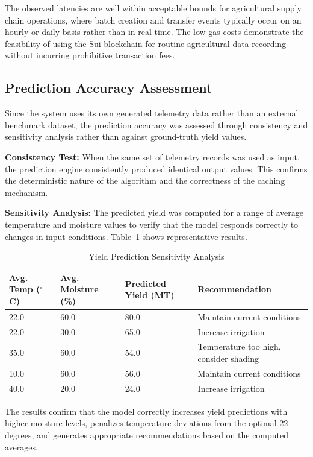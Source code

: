 The observed latencies are well within acceptable bounds for agricultural supply chain operations, where batch creation and transfer events typically occur on an hourly or daily basis rather than in real-time. The low gas costs demonstrate the feasibility of using the Sui blockchain for routine agricultural data recording without incurring prohibitive transaction fees.

\subsection{Prediction Accuracy Assessment}

Since the system uses its own generated telemetry data rather than an external benchmark dataset, the prediction accuracy was assessed through consistency and sensitivity analysis rather than against ground-truth yield values.

\textbf{Consistency Test:} When the same set of telemetry records was used as input, the prediction engine consistently produced identical output values. This confirms the deterministic nature of the algorithm and the correctness of the caching mechanism.

\textbf{Sensitivity Analysis:} The predicted yield was computed for a range of average temperature and moisture values to verify that the model responds correctly to changes in input conditions. Table~\ref{tab:sensitivity} shows representative results.

\begin{table}[H]
\centering
\caption{Yield Prediction Sensitivity Analysis}
\label{tab:sensitivity}
\begin{tabularx}{\textwidth}{|l|l|l|X|}
\hline
\textbf{Avg. Temp ($^\circ$C)} & \textbf{Avg. Moisture (\%)} & \textbf{Predicted Yield (MT)} & \textbf{Recommendation} \\
\hline
22.0 & 60.0 & 80.0 & Maintain current conditions \\
\hline
22.0 & 30.0 & 65.0 & Increase irrigation \\
\hline
35.0 & 60.0 & 54.0 & Temperature too high, consider shading \\
\hline
10.0 & 60.0 & 56.0 & Maintain current conditions \\
\hline
40.0 & 20.0 & 24.0 & Increase irrigation \\
\hline
\end{tabularx}
\end{table}

The results confirm that the model correctly increases yield predictions with higher moisture levels, penalizes temperature deviations from the optimal 22 degrees, and generates appropriate recommendations based on the computed averages.

